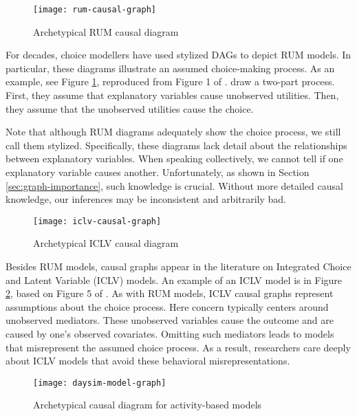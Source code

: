 \begin{figure}
   \centering
   \texttt{[image: rum-causal-graph]}
   \caption{Archetypical RUM causal diagram}
   \label{fig:example-graph-rum}
\end{figure}

For decades, choice modellers have used stylized DAGs to depict RUM models.
In particular, these diagrams illustrate an assumed choice-making process.
As an example, see Figure \ref{fig:example-graph-rum}, reproduced from Figure 1 of \citet{ben_2002_integration}.
\citeauthor{ben_2002_integration} draw a two-part process.
First, they assume that explanatory variables cause unobserved utilities.
Then, they assume that the unobserved utilities cause the choice.

Note that although RUM diagrams adequately show the choice process, we still call them stylized.
Specifically, these diagrams lack detail about the relationships between explanatory variables.
When speaking collectively, we cannot tell if one explanatory variable causes another.
Unfortunately, as shown in Section \ref{sec:graph-importance}, such knowledge is crucial.
Without more detailed causal knowledge, our inferences may be inconsistent and arbitrarily bad.

\begin{figure}
   \centering
   \texttt{[image: iclv-causal-graph]}
   \caption{Archetypical ICLV causal diagram}
   \label{fig:example-graph-iclv}
\end{figure}


Besides RUM models, causal graphs appear in the literature on Integrated Choice and Latent Variable (ICLV) models.
An example of an ICLV model is in Figure \ref{fig:example-graph-iclv}, based on Figure 5 of \citet{ben_2002_integration}.
As with RUM models, ICLV causal graphs represent assumptions about the choice process.
Here concern typically centers around unobserved mediators.
These unobserved variables cause the outcome and are caused by one's observed covariates.
Omitting such mediators leads to models that misrepresent the assumed choice process.
As a result, researchers care deeply about ICLV models that avoid these behavioral misrepresentations.

\begin{figure}
   \centering
   \texttt{[image: daysim-model-graph]}
   \caption{Archetypical causal diagram for activity-based models}
   \label{fig:example-graph-abm}
\end{figure}

